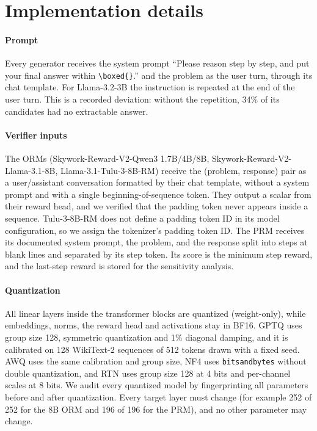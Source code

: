 \section{Implementation details}\label{app:impl}

\paragraph{Prompt} Every generator receives the system prompt ``Please reason step by
step, and put your final answer within \texttt{\textbackslash boxed\{\}}.'' and the
problem as the user turn, through its chat template. For Llama-3.2-3B the instruction is
repeated at the end of the user turn. This is a recorded deviation: without the
repetition, 34\% of its candidates had no extractable answer.

\paragraph{Verifier inputs} The ORMs (Skywork-Reward-V2-Qwen3 1.7B/4B/8B,
Skywork-Reward-V2-Llama-3.1-8B, Llama-3.1-Tulu-3-8B-RM) receive the (problem, response)
pair as a user/assistant conversation formatted by their chat template, without a system
prompt and with a single beginning-of-sequence token. They output a scalar from their
reward head, and we verified that the padding token never appears inside a sequence.
Tulu-3-8B-RM does not define a padding token ID in its model configuration, so we assign
the tokenizer's padding token ID. The PRM receives its documented system prompt, the
problem, and the response split into steps at blank lines and separated by its step
token. Its score is the minimum step reward, and the last-step reward is stored for the
sensitivity analysis.

\paragraph{Quantization} All linear layers inside the transformer blocks are quantized
(weight-only), while embeddings, norms, the reward head and activations stay in BF16.
GPTQ uses group size 128, symmetric quantization and 1\% diagonal damping, and it is
calibrated on 128 WikiText-2 sequences of 512 tokens drawn with a fixed seed. AWQ uses
the same calibration and group size, NF4 uses \texttt{bitsandbytes} without double
quantization, and RTN uses group size 128 at 4 bits and per-channel scales at 8 bits. We
audit every quantized model by fingerprinting all parameters before and after
quantization. Every target layer must change (for example 252 of 252 for the 8B ORM and
196 of 196 for the PRM), and no other parameter may change.

